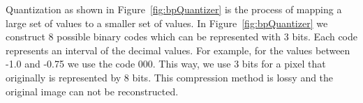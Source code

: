 Quantization as shown in Figure~\ref{fig:bpQuantizer} is the process of mapping a large set of values to a smaller set of values. In Figure~\ref{fig:bpQuantizer} we construct 8 possible binary codes which can be represented with 3 bits. Each code represents an interval of the decimal values. For example, for the values between -1.0 and -0.75 we use the code 000. This way, we use 3 bits for a pixel that originally is represented by 8 bits. This compression method is lossy and the original image can not be reconstructed. 
